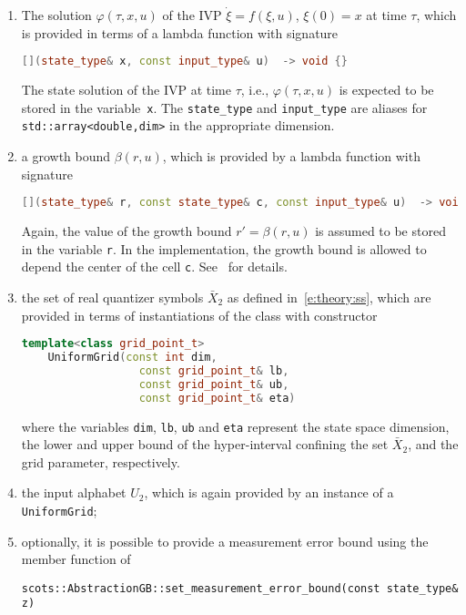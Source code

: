 \documentclass[a4paper]{amsart}
\begin{document}
\begin{enumerate}
  \item The solution $\varphi(\tau,x,u)$ of the IVP $\dot \xi = f(\xi,u)$,
  $\xi(0)=x$ at time $\tau$, which is provided in terms of a lambda function
  with signature 
  \begin{lstlisting}[basicstyle=\small\ttfamily, language=C++]
    [](state_type& x, const input_type& u)  -> void {}
  \end{lstlisting}
  The state solution of the IVP at time $\tau$, i.e., $\varphi(\tau,x,u)$ is
  expected to be stored in the variable~{\tt x}. The {\tt state\_type} and
  {\tt\small input\_type} are aliases for {\tt\small std::array<double,dim>} in the appropriate
  dimension.

  \item a growth bound $\beta(r,u)$, which is provided by a lambda function with
  signature 
  \begin{lstlisting}[basicstyle=\small\ttfamily, language=C++]
    [](state_type& r, const state_type& c, const input_type& u)  -> void {}
  \end{lstlisting}
  Again, the value of the growth bound $r'=\beta(r,u)$ is assumed to be stored
  in the variable {\tt r}. In the implementation, the growth bound is allowed
  to depend the center of the cell {\tt c}. See~\cite{WeberRunggerReissig17} for
  details.

  \item the set of real quantizer symbols $\bar X_2$ as defined
  in~\eqref{e:theory:ss}, which are provided in terms of instantiations of the class with constructor
  \begin{lstlisting}[basicstyle=\small\ttfamily, language=C++]
    template<class grid_point_t>
    UniformGrid(const int dim,
                  const grid_point_t& lb,
                  const grid_point_t& ub,
                  const grid_point_t& eta)
  \end{lstlisting}
  where the variables {\tt dim}, {\tt lb}, {\tt ub} and {\tt eta} represent the
  state space dimension, the lower and upper bound of the hyper-interval
  confining the set $\bar X_2$, and the grid parameter, respectively.
  \item the input alphabet $U_2$, which is again provided by an instance
  of a {\tt UniformGrid};
  \item optionally, it is possible to provide a measurement error bound using the
  member function of 
  \begin{lstlisting}[basicstyle=\small\ttfamily]
    scots::AbstractionGB::set_measurement_error_bound(const state_type& z)
  \end{lstlisting}
\end{enumerate}
\end{document}
